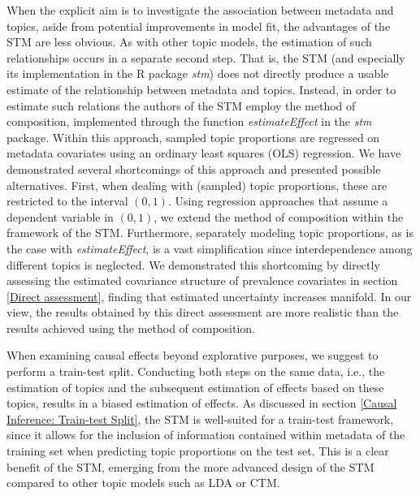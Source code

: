 When the explicit aim is to investigate the association between metadata and topics, aside from potential improvements in model fit, the advantages of the STM are less obvious. As with other topic models, the estimation of such relationships occurs in a separate second step. That is, the STM (and especially its implementation in the R package \textit{stm}) does not directly produce a usable estimate of the relationship between metadata and topics. Instead, in order to estimate such relations the authors of the STM employ the method of composition, implemented through the function \textit{estimateEffect} in the \textit{stm} package. Within this approach, sampled topic proportions are regressed on metadata covariates using an ordinary least squares (OLS) regression. We have demonstrated several shortcomings of this approach and presented possible alternatives. First, when dealing with (sampled) topic proportions, these are restricted to the interval $(0,1)$. Using regression approaches that assume a dependent variable in $(0,1)$, we extend the method of composition within the framework of the STM. Furthermore, separately modeling topic proportions, as is the case with \textit{estimateEffect}, is a vast simplification since interdependence among different topics is neglected. We demonstrated this shortcoming by directly assessing the estimated covariance structure of prevalence covariates in section \ref{Direct assessment}, finding that estimated uncertainty increases manifold. In our view, the results obtained by this direct assessment are more realistic than the results achieved using the method of composition. 

When examining causal effects beyond explorative purposes, we suggest to perform a train-test split. Conducting both steps on the same data, i.e., the estimation of topics and the subsequent estimation of effects based on these topics, results in a biased estimation of effects. As discussed in section \ref{Causal Inference: Train-test Split}, the STM is well-suited for a train-test framework, since it allows for the inclusion of information contained within metadata of the training set when predicting topic proportions on the test set. This is a clear benefit of the STM, emerging from the more advanced design of the STM compared to other topic models such as LDA or CTM.

